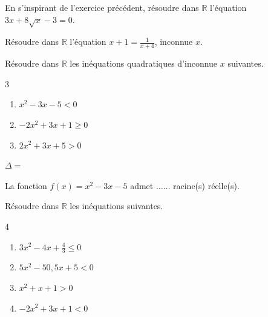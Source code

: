 \documentclass[main.tex]{subfiles}
\begin{document}
\begin{exercise} 
	En s'inspirant de l'exercice précédent, résoudre dans $\mathbb{R}$ l'équation $3x+8\sqrt{x}-3=0$.
\end{exercise}
\begin{exercise}Résoudre dans $\mathbb{R}$ l'équation $x+1=\frac{1}{x+4}$, inconnue $x$.

\end{exercise} 
%	 
\newpage  
\begin{example} Résoudre dans $\mathbb{R}$ les inéquations quadratiques d'inconnue $x$ suivantes.
	\vspace{-1em}
\begin{multicols}{3}
	\begin{enumerate}[label={$(I_{\arabic*})$}, leftmargin=*]
		\item $x^2-3x-5<0$ 
		\item $-2x^2+3x+1\geqslant 0$ 
		\item $2x^2+3x+5>0$  
	\end{enumerate} 
\end{multicols}   
 
\noindent
\parbox{0.33\linewidth}{
$\Delta=$

La fonction $f(x)=x^2-3x-5$ admet $\ldots\ldots$ racine(s) réelle(s).
 
}

\vfill 
\end{example}
 
\begin{exercise}\label{chapter03:exercice:determinant:inequation01}
	Résoudre dans $\mathbb{R}$ les inéquations suivantes.
	\vspace{-1em}
	\begin{multicols}{4}
	\begin{enumerate}[label={$(I_{\arabic*})$}, leftmargin=*]
			\item $3x^2-4x+\frac{4}{3}\leqslant 0$ 
			\item $5x^2-50,5x+5<0$ 
			\item $x^2+x+1>0$ 
			\item $-2x^2+3x+1<0$  
	\end{enumerate}
\end{multicols}   
\end{exercise}
\end{document}
